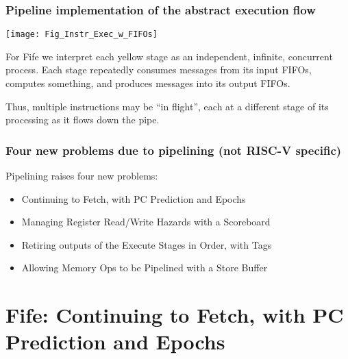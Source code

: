 \begin{frame}[fragile]
\frametitle{Pipeline implementation of the abstract execution flow}

\footnotesize

\begin{center}
 \texttt{[image: Fig\_Instr\_Exec\_w\_FIFOs]}
\end{center}

For Fife we interpret each yellow stage as an independent, infinite,
concurrent process.  Each stage repeatedly consumes messages from its
input FIFOs, computes something, and produces messages into its output
FIFOs.

\vspace{1ex}

Thus, multiple instructions may be ``in flight'', each at a different
stage of its processing as it flows down the pipe.

\end{frame}


\begin{frame}[fragile]
\frametitle{Four new problems due to pipelining (not RISC-V specific)}

\footnotesize

Pipelining raises four new problems:

\vspace{2ex}

\begin{itemize}

  \item Continuing to Fetch, with PC Prediction and Epochs

  \item Managing Register Read/Write Hazards with a Scoreboard

  \item Retiring outputs of the Execute Stages in Order, with Tags

  \item Allowing Memory Ops to be Pipelined with a Store Buffer

\end{itemize}


\end{frame}


\section{Fife: Continuing to Fetch, with PC Prediction and Epochs}


